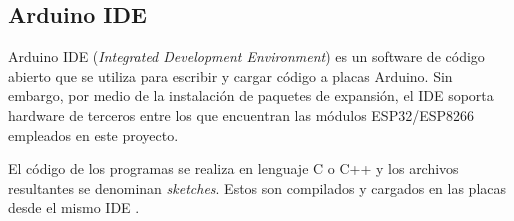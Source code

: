 %
%

\subsection{Arduino IDE}
\label{sec:Arduino IDE}

Arduino IDE (\textit{Integrated Development Environment}) es un software de código abierto que se utiliza para escribir y cargar código a placas Arduino. Sin embargo, por medio de la instalación de paquetes de expansión, el IDE soporta hardware de terceros entre los que encuentran las módulos ESP32/ESP8266 \citep{Arduinosupport} empleados en este proyecto.

El código de los programas se realiza en lenguaje C o C++ y los archivos resultantes se denominan \textit{sketches}. Estos son compilados y cargados en las placas desde el mismo IDE \citep{arduinoide}.

